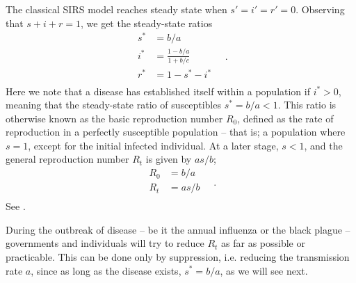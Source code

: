 \documentclass[]{article}
\begin{document}
The classical SIRS model reaches steady state when $s'=i'=r'=0$. Observing that $s + i + r = 1$, we get the steady-state ratios
\begin{equation} \label{eq:sirs-classic-steady}
\begin{aligned}
	s^* &= b/a \\
	i^* &= \frac{1 - b/a}{1 + b/c} \\
	r^* &= 1 - s^* - i^* \\
\end{aligned} \quad .
\end{equation}
Here we note that a disease has established itself within a population if $i^* > 0$, meaning that the steady-state ratio of susceptibles $s^* = b/a < 1$. This ratio is otherwise known as the basic reproduction number $R_0$, defined as the rate of reproduction in a perfectly susceptible population -- that is; a population where $s = 1$, except for the initial infected individual. At a later stage, $s < 1$, and the general reproduction number $R_t$ is given by $as/b$;
\begin{equation} \label{eq:reproduction-numbers}
\begin{aligned}
	R_0 &= b/a \\
	R_t &= as/b \\
\end{aligned} \quad .
\end{equation}
See \cite{milligan2015}.

During the outbreak of disease -- be it the annual influenza or the black plague -- governments and individuals will try to reduce $R_t$ as far as possible or practicable. This can be done only by suppression, i.e. reducing the transmission rate $a$, since as long as the disease exists, $s^* = b/a$, as we will see next. 
\end{document}
